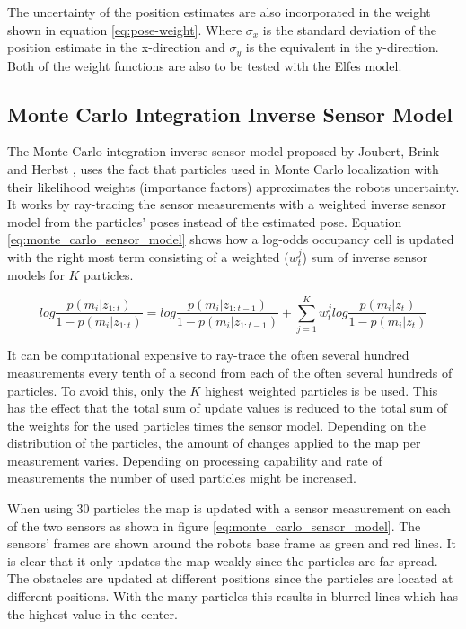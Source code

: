 The uncertainty of the position estimates are also incorporated in the weight shown in equation \vref{eq:pose-weight}.
Where \(\sigma_x\) is the standard deviation of the position estimate in the x-direction and \(\sigma_y\) is the equivalent in the y-direction.
Both of the weight functions are also to be tested with the Elfes model.

\subsection{Monte Carlo Integration Inverse Sensor Model}
\label{sec:monte_carlo_sensor Model}
The Monte Carlo integration inverse sensor model proposed by Joubert, Brink and Herbst \cite{Joubert2014},  uses the fact that particles used in Monte Carlo localization with their likelihood weights (importance factors) approximates the robots uncertainty. 
It works by ray-tracing the sensor measurements with a weighted inverse sensor model from the particles' poses instead of the estimated pose. 
Equation \vref{eq:monte_carlo_sensor_model} shows how a log-odds occupancy cell is updated with the right most term consisting of a weighted ($w_t^j$) sum of inverse sensor models for $K$ particles.

\begin{equation}
log \frac{p(m_i|z_{1:t})}{1-p(m_i|z_{1:t})} = log \frac{p(m_i|z_{1:t-1})}{1-p(m_i|z_{1:t-1})} + \sum_{j=1}^{K} w_t^j log \frac{ p(m_i | z_t) }{ 1 - p(m_i | z_t) }
\label{eq:monte_carlo_sensor_model}
\end{equation}

It can be computational expensive to ray-trace the often several hundred measurements every tenth of a second from each of the often several hundreds of particles.
To avoid this, only the $K$ highest weighted particles is be used. 
This has the effect that the total sum of update values is reduced to the total sum of the weights for the used particles times the sensor model.
Depending on the distribution of the particles, the amount of changes applied to the map per measurement varies.
Depending on processing capability and rate of measurements the number of used particles might be increased.

When using $30$ particles the map is updated with a sensor measurement on each of the two sensors as shown in figure \vref{eq:monte_carlo_sensor_model}.
The sensors' frames are shown around the robots base frame as green and red lines.
It is clear that it only updates the map weakly since the particles are far spread. 
The obstacles are updated at different positions since the particles are located at different positions. With the many particles this results in blurred lines which has the highest value in the center.

